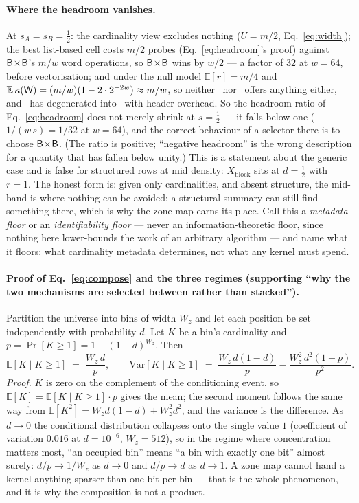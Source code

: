 \paragraph*{Where the headroom vanishes.}
At $s_A=s_B=\tfrac12$: the cardinality view excludes nothing ($U=m/2$, Eq.~\eqref{eq:width}); the best
list-based cell costs $m/2$ probes (Eq.~\eqref{eq:headroom}'s proof) against $\textsf{B}\!\times\!\textsf{B}$'s $m/w$
word operations, so $\textsf{B}\!\times\!\textsf{B}$ wins by $w/2$ --- a factor of $32$ at $w=64$, before
vectorisation; and under the null model $\mathbb{E}[r]=m/4$ and
$\mathbb{E}\,\kappa(\textsf{W})=(m/w)(1-2\cdot2^{-2w})\approx m/w$, so neither \rR\ nor \rW\ offers anything
either, and \rW\ has degenerated into \rB\ with header overhead. So the headroom ratio of
Eq.~\eqref{eq:headroom} does not merely shrink at $s=\tfrac12$ --- it falls below one ($1/(w\,s)=1/32$
at $w=64$), and the correct behaviour of a selector there is to choose $\textsf{B}\!\times\!\textsf{B}$. (The ratio is
positive; ``negative headroom'' is the wrong description for a quantity that has fallen
below unity.) This is a statement about the generic case and is false for structured rows at
mid density: $X_{\mathrm{block}}$ sits at $d=\tfrac12$ with $r=1$. The honest form is: given only
cardinalities, and absent structure, the mid-band is where nothing can be avoided; a structural summary
can still find something there, which is why the zone map earns its place. Call this a \emph{metadata
floor} or an \emph{identifiability floor} --- never an information-theoretic floor, since nothing
here lower-bounds the work of an arbitrary algorithm --- and name what it floors: what cardinality
metadata determines, not what any kernel must spend.

\paragraph*{Proof of Eq.~\eqref{eq:compose} and the three regimes (supporting ``why the two mechanisms
are selected between rather than stacked'').}
Partition the universe into bins of width $W_z$ and let each position be set independently with
probability $d$. Let $K$ be a bin's cardinality and $p=\Pr[K\ge1]=1-(1-d)^{W_z}$. Then
\begin{equation}
\mathbb{E}[K\mid K\ge1] \;=\; \frac{W_z\,d}{p}, \qquad
\mathrm{Var}[K\mid K\ge1] \;=\; \frac{W_z\,d(1-d)}{p} - \frac{W_z^2\,d^2(1-p)}{p^2}.
\label{eq:s3-concentration}
\end{equation}
\emph{Proof.} $K$ is zero on the complement of the conditioning event, so $\mathbb{E}[K]=\mathbb{E}[K\mid K\ge1]\cdot p$
gives the mean; the second moment follows the same way from $\mathbb{E}[K^2]=W_zd(1-d)+W_z^2d^2$, and the
variance is the difference. As $d\to0$ the conditional distribution collapses onto the single value $1$
(coefficient of variation $0.016$ at $d=10^{-6}$, $W_z=512$), so in the regime where concentration
matters most, ``an occupied bin'' means ``a bin with exactly one bit'' almost surely: $d/p\to1/W_z$ as
$d\to0$ and $d/p\to d$ as $d\to1$. A zone map cannot hand a kernel anything sparser than one bit
per bin --- that is the whole phenomenon, and it is why the composition is not a product.


